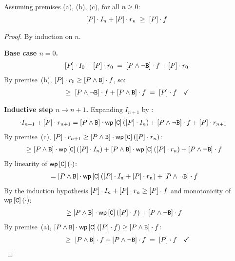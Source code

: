 \documentclass[acmsmall,natbib,review,screen,anonymous,10pt]{acmart}
\begin{document}

\begin{lemma}\label{lem:key-ineq}
Assuming premises \textnormal{(a)}, \textnormal{(b)}, \textnormal{(c)},
for all $n \geq 0$:
\[
  [P] \cdot I_n + [P] \cdot r_n \;\geq\; [P] \cdot f
\]
\end{lemma}

\begin{proof}
By induction on $n$.

\medskip\noindent\textbf{Base case $n = 0$.}
\[
  [P] \cdot I_0 + [P] \cdot r_0
  \;=\; [P \wedge \neg\mathtt{B}] \cdot f + [P] \cdot r_0
\]
By premise~(b), $[P] \cdot r_0 \geq [P \wedge \mathtt{B}] \cdot f$, so:
\[
  \;\geq\; [P \wedge \neg\mathtt{B}] \cdot f + [P \wedge \mathtt{B}] \cdot f
  \;=\; [P] \cdot f \quad\checkmark
\]

\medskip\noindent\textbf{Inductive step $n \to n+1$.}
Expanding $I_{n+1}$ by :
\begin{align*}
  [\pred] \cdot I_{n+1} + [\pred] \cdot r_{n+1}
  &= [\pred \wedge \bexpr] \cdot \WP{\cmd}{[\pred] \cdot I_n}
     + [\pred \wedge \neg\bexpr] \cdot \ex
     + [\pred] \cdot r_{n+1}
\end{align*}
By premise~(c), $[P] \cdot r_{n+1} \geq [P \wedge \mathtt{B}] \cdot \mathsf{wp}\left[{\mathtt{C}}\right]\left({[P] \cdot r_n}\right)$:
\begin{align*}
  &\geq [P \wedge \mathtt{B}] \cdot \mathsf{wp}\left[{\mathtt{C}}\right]\left({[P] \cdot I_n}\right)
        + [P \wedge \mathtt{B}] \cdot \mathsf{wp}\left[{\mathtt{C}}\right]\left({[P] \cdot r_n}\right)
        + [P \wedge \neg\mathtt{B}] \cdot f
\end{align*}
By linearity of $\mathsf{wp}\left[{\mathtt{C}}\right]\left({\cdot}\right)$:
\begin{align*}
  &= [P \wedge \mathtt{B}] \cdot \mathsf{wp}\left[{\mathtt{C}}\right]\left({[P] \cdot I_n + [P] \cdot r_n}\right)
     + [P \wedge \neg\mathtt{B}] \cdot f
\end{align*}
By the induction hypothesis
$[P] \cdot I_n + [P] \cdot r_n \geq [P] \cdot f$
and monotonicity of $\mathsf{wp}\left[{\mathtt{C}}\right]\left({\cdot}\right)$:
\begin{align*}
  &\geq [P \wedge \mathtt{B}] \cdot \mathsf{wp}\left[{\mathtt{C}}\right]\left({[P] \cdot f}\right)
        + [P \wedge \neg\mathtt{B}] \cdot f
\end{align*}
By premise~(a),
$[P \wedge \mathtt{B}] \cdot \mathsf{wp}\left[{\mathtt{C}}\right]\left({[P] \cdot f}\right) \geq [P \wedge \mathtt{B}] \cdot f$:
\[
  \;\geq\; [P \wedge \mathtt{B}] \cdot f + [P \wedge \neg\mathtt{B}] \cdot f
  \;=\; [P] \cdot f \quad\checkmark
\]
\end{proof}
\end{document}
